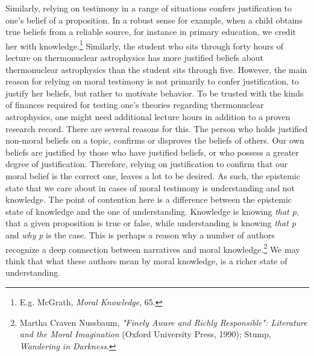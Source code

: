 \documentclass[
  12pt,
]{book}
\theoremstyle{definition}
\theoremstyle{definition}
\theoremstyle{definition}
\theoremstyle{definition}
\theoremstyle{remark}
\begin{document}
Similarly, relying on testimony in a range of situations confers justification to one's belief of a proposition. In a robust sense for example, when a child obtains true beliefs from a reliable source, for instance in primary education, we credit her with knowledge.\footnote{E.g. McGrath, \emph{Moral {Knowledge}}, 65.} Similarly, the student who sits through forty hours of lecture on thermonuclear astrophysics has more justified beliefs about thermonuclear astrophysics than the student sits through five. However, the main reason for relying on moral testimony is not primarily to confer justification, to justify her beliefs, but rather to motivate behavior. To be trusted with the kinds of finances required for testing one's theories regarding thermonuclear astrophysics, one might need additional lecture hours in addition to a proven research record. There are several reasons for this. The person who holds justified non-moral beliefs on a topic, confirms or disproves the beliefs of others. Our own beliefs are justified by those who have justified beliefs, or who possess a greater degree of justification. Therefore, relying on justification to confirm that our moral belief is the correct one, leaves a lot to be desired. As such, the epistemic state that we care about in cases of moral testimony is understanding and not knowledge. The point of contention here is a difference between the epistemic state of knowledge and the one of understanding. Knowledge is knowing \emph{that p}, that a given proposition is true or false, while understanding is knowing \emph{that p} and \emph{why} \emph{p} is the case. This is perhaps a reason why a number of authors recognize a deep connection between narratives and moral knowledge.\footnote{Martha Craven Nussbaum, \emph{"{Finely Aware} and {Richly Responsible}": {Literature} and the {Moral Imagination}} (Oxford University Press, 1990); Stump, \emph{Wandering in {Darkness}}.} We may think that what these authors mean by moral knowledge, is a richer state of understanding.
\end{document}
